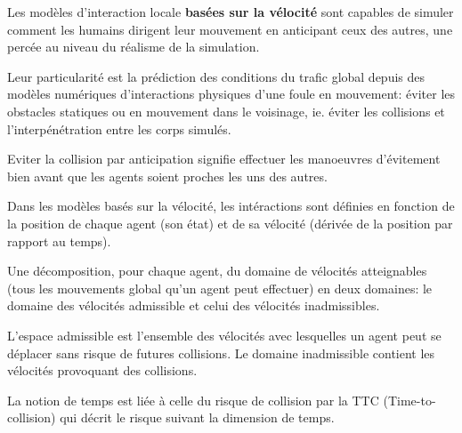 \documentclass[11pt]{article}
\begin{document}
Les modèles d'interaction locale \textbf{basées sur la vélocité} sont capables de simuler comment les humains dirigent leur mouvement en anticipant ceux des autres, une percée au niveau du réalisme de la simulation.
 
Leur particularité est la prédiction des conditions du trafic global depuis des modèles numériques d'interactions physiques d'une foule en mouvement: éviter les obstacles statiques ou en mouvement dans le voisinage, ie. éviter les collisions et l'interpénétration entre les corps simulés.

Eviter la collision par anticipation signifie effectuer les manoeuvres d'évitement bien avant que les agents soient proches les uns des autres.

Dans les modèles basés sur la vélocité, les intéractions sont définies en fonction de la position de chaque agent (son état) et de sa vélocité (dérivée de la position par rapport au temps).

Une décomposition, pour chaque agent, du domaine de vélocités atteignables (tous les mouvements global qu'un agent peut effectuer) en deux domaines: le domaine des vélocités admissible et celui des vélocités inadmissibles.

L'espace admissible est l'ensemble des vélocités avec lesquelles un agent peut se déplacer sans risque de futures collisions. Le domaine inadmissible contient les vélocités provoquant des collisions.

La notion de temps est liée à celle du risque de collision par la TTC (Time-to-collision) qui  décrit le risque suivant la dimension de temps.
\end{document}
